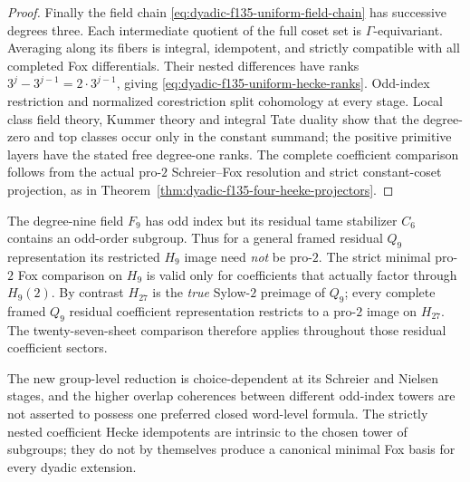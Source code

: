 \begin{proof}
Finally the
field chain
\eqref{eq:dyadic-f135-uniform-field-chain}
has successive
degrees three.
Each intermediate
quotient of
the full coset
set is
$\Gamma$-equivariant.
Averaging along
its fibers
is integral,
idempotent,
and strictly
compatible
with all
completed Fox
differentials.
Their nested
differences
have ranks
$3^j-3^{j-1}
=2\cdot3^{j-1}$,
giving
\eqref{eq:dyadic-f135-uniform-hecke-ranks}.
Odd-index
restriction and
normalized
corestriction
split
cohomology
at every stage.
Local
class field
theory,
Kummer theory
and integral
Tate duality
show that the
degree-zero and
top classes
occur only
in the constant
summand;
the positive
primitive layers
have the stated
free degree-one
ranks.
The complete
coefficient
comparison follows
from the actual
pro-$2$
Schreier--Fox
resolution and
strict constant-coset
projection, as in
Theorem~\ref{thm:dyadic-f135-four-heeke-projectors}.
\end{proof}

\begin{warning}
\label{warn:dyadic-f135-nine-versus-27}
The degree-nine
field $F_9$
has odd index
but its
residual tame
stabilizer $C_6$
contains an
odd-order
subgroup.
Thus for a
general framed
residual $Q_9$
representation
its restricted
$H_9$ image
need \emph{not}
be pro-$2$.
The strict
minimal
pro-$2$ Fox
comparison on
$H_9$
is valid only
for coefficients
that actually
factor through
$H_9(2)$.
By contrast
$H_{27}$ is
the \emph{true}
Sylow-$2$ preimage
of $Q_9$;
every complete
framed
$Q_9$ residual
coefficient
representation
restricts to
a pro-$2$
image on
$H_{27}$.
The twenty-seven-sheet
comparison therefore
applies throughout
those residual
coefficient sectors.

The new
group-level
reduction is
choice-dependent
at its Schreier
and Nielsen
stages, and
the higher
overlap
coherences
between
different
odd-index
towers are
not asserted
to possess one
preferred
closed
word-level
formula.
The
strictly nested
coefficient
Hecke idempotents
are intrinsic
to the
chosen tower
of subgroups;
they do not
by themselves
produce a
canonical
minimal Fox
basis for
every dyadic
extension.
\end{warning}
